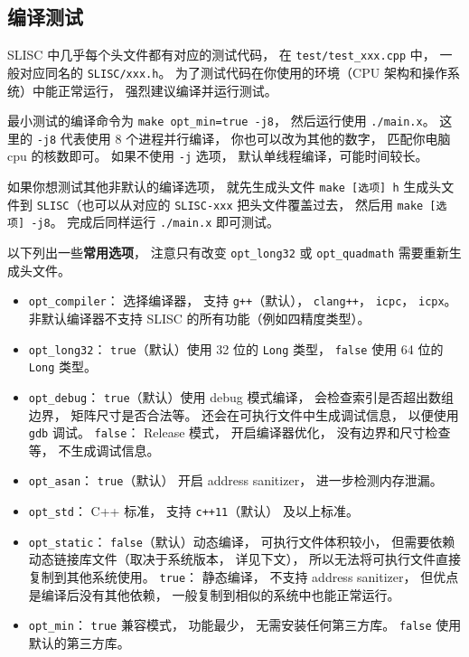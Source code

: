 \subsection{编译测试}
SLISC 中几乎每个头文件都有对应的测试代码， 在 \verb|test/test_xxx.cpp| 中， 一般对应同名的 \verb|SLISC/xxx.h|。 为了测试代码在你使用的环境（CPU 架构和操作系统）中能正常运行， 强烈建议编译并运行测试。

最小测试的编译命令为 \verb|make opt_min=true -j8|， 然后运行使用 \verb|./main.x|。 这里的 \verb|-j8| 代表使用 8 个进程并行编译， 你也可以改为其他的数字， 匹配你电脑 cpu 的核数即可。 如果不使用 \verb|-j| 选项， 默认单线程编译，可能时间较长。

如果你想测试其他非默认的编译选项， 就先生成头文件 \verb|make [选项] h| 生成头文件到 \verb|SLISC|（也可以从对应的 \verb|SLISC-xxx| 把头文件覆盖过去， 然后用 \verb|make [选项] -j8|。 完成后同样运行 \verb|./main.x| 即可测试。

以下列出一些\textbf{常用选项}， 注意只有改变 \verb|opt_long32| 或 \verb|opt_quadmath| 需要重新生成头文件。
\begin{itemize}
\item \verb|opt_compiler|： 选择编译器， 支持 \verb|g++|（默认）， \verb|clang++|， \verb|icpc|， \verb|icpx|。 非默认编译器不支持 SLISC 的所有功能（例如四精度类型）。
\item \verb|opt_long32|： \verb|true|（默认）使用 32 位的 \verb|Long| 类型， \verb|false| 使用 64 位的 \verb|Long| 类型。
\item \verb|opt_debug|： \verb|true|（默认）使用 debug 模式编译， 会检查索引是否超出数组边界， 矩阵尺寸是否合法等。 还会在可执行文件中生成调试信息， 以便使用 \verb|gdb| 调试。 \verb|false|： Release 模式， 开启编译器优化， 没有边界和尺寸检查等， 不生成调试信息。
\item \verb|opt_asan|： \verb|true|（默认） 开启 address sanitizer， 进一步检测内存泄漏。
\item \verb|opt_std|： C++ 标准， 支持 \verb|c++11|（默认） 及以上标准。
\item \verb|opt_static|： \verb|false|（默认）动态编译， 可执行文件体积较小， 但需要依赖动态链接库文件（取决于系统版本， 详见下文）， 所以无法将可执行文件直接复制到其他系统使用。 \verb|true|： 静态编译， 不支持 address sanitizer， 但优点是编译后没有其他依赖， 一般复制到相似的系统中也能正常运行。
\item \verb|opt_min|： \verb|true| 兼容模式， 功能最少， 无需安装任何第三方库。 \verb|false| 使用默认的第三方库。
\end{itemize}

